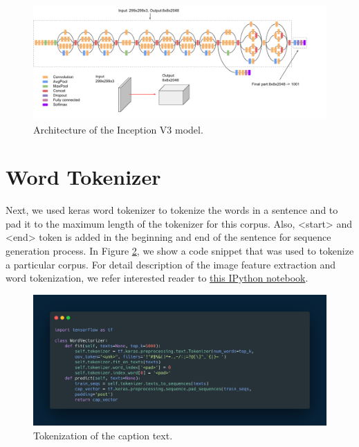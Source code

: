 \documentclass[12pt]{article}
\begin{document}
\begin{figure}[h!]
\begin{center}
\includegraphics[width=7in]{inceptionv3.png}
\end{center}
\caption{\label{fig:inceptionv3}
Architecture of the Inception V3 model.}
\end{figure}

\section{Word Tokenizer}
\label{sec:imfeat}

Next, we used keras word tokenizer to tokenize the words in a sentence and to pad it to the maximum length of the tokenizer for this corpus. Also, <start> and <end> token is added in the beginning and end of the sentence for sequence generation process. In Figure \ref{fig:word_vec}, we show a code snippet that was used to tokenize a particular corpus. For detail description of the image feature extraction and word tokenization, we refer interested reader to \href{https://github.com/mamunm/iamge_caption_generator/blob/main/notebooks/data_processing.ipynb}{this IPython notebook}.

\begin{figure}[h!]
\begin{center}
\includegraphics[width=7in]{word_vec.png}
\end{center}
\caption{\label{fig:word_vec}
Tokenization of the caption text.}
\end{figure}
\end{document}
